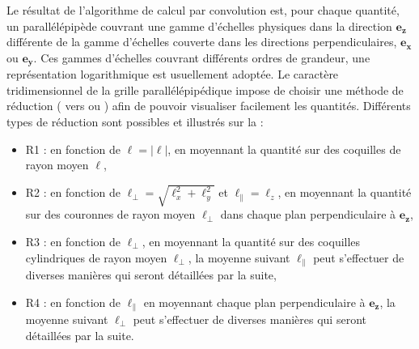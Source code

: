  Le résultat de l'algorithme de calcul par convolution est, pour chaque quantité, un parallélépipède couvrant une gamme d'échelles physiques dans la direction $\boldsymbol{e_z}$ différente de la gamme d'échelles couverte dans les directions perpendiculaires, $\boldsymbol{e_x}$ ou $\boldsymbol{e_y}$.  
 Ces gammes d'échelles couvrant différents ordres de grandeur, une représentation logarithmique est usuellement adoptée. Le caractère tridimensionnel de la grille parallélépipédique impose de choisir une méthode de réduction ( vers  ou ) afin de pouvoir visualiser facilement les quantités. Différents types de réduction sont possibles et illustrés sur la  : 
 
\begin{itemize}
    \item R1 :  en fonction de $\ell = |\boldsymbol{\ell}|$, en moyennant la quantité sur des coquilles de rayon moyen $\ell$,
    \item R2 :  en fonction de $\ell_{\perp} = \sqrt{\ell_x^2 + \ell_y^2}$ et $\ell_{\parallel} = \ell_z$, en moyennant la quantité sur des couronnes de rayon moyen $\ell_{\perp}$ dans chaque plan perpendiculaire à $\boldsymbol{e_z}$,
    \item R3 :  en fonction de $\ell_{\perp}$, en moyennant la quantité sur des coquilles cylindriques de rayon moyen $\ell_{\perp}$, la moyenne suivant $\ell_{\parallel}$ peut s'effectuer de diverses manières qui seront détaillées par la suite,
    \item R4 :  en fonction de $\ell_{\parallel}$ en moyennant chaque plan perpendiculaire à $\boldsymbol{e_z}$, la moyenne suivant $\ell_{\perp}$ peut s'effectuer de diverses manières qui seront détaillées par la suite. 
\end{itemize}
 
